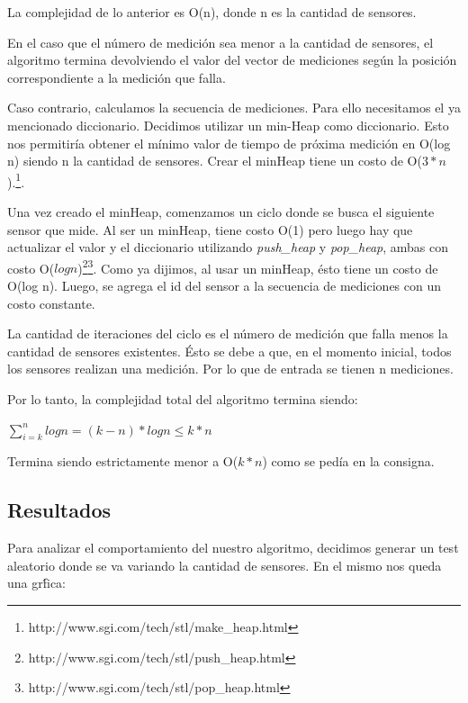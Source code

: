 \quad La complejidad de lo anterior es O(n), donde n es la cantidad de sensores.

\quad En el caso que el n\'umero de medici\'on sea menor a la cantidad de sensores, el algoritmo termina devolviendo el valor del vector de mediciones seg\'un la posici\'on correspondiente a la medici\'on que falla.

\quad Caso contrario, calculamos la secuencia de mediciones. Para ello necesitamos el ya mencionado diccionario. Decidimos utilizar un min-Heap como diccionario. Esto nos permitir\'ia obtener el m\'inimo valor de tiempo de pr\'oxima medici\'on en O(log n) siendo n la cantidad de sensores. Crear el minHeap tiene un costo de O($ 3*n $).\footnote{http://www.sgi.com/tech/stl/make\_heap.html}.

\quad Una vez creado el minHeap, comenzamos un ciclo donde se busca el siguiente sensor que mide. Al ser un minHeap, tiene costo O(1) pero luego hay que actualizar el valor y el diccionario utilizando \textit{push\_heap} y \textit{pop\_heap}, ambas con costo O($log n$)\footnote{http://www.sgi.com/tech/stl/push\_heap.html}\footnote{http://www.sgi.com/tech/stl/pop\_heap.html}. Como ya dijimos, al usar un minHeap, \'esto tiene un costo de O(log n). Luego, se agrega el id del sensor a la secuencia de mediciones con un costo constante.

\quad La cantidad de iteraciones del ciclo es el n\'umero de medici\'on que falla menos la cantidad de sensores existentes. \'Esto se debe a que, en el momento inicial, todos los sensores realizan una medici\'on. Por lo que de entrada se tienen n mediciones.

\quad Por lo tanto, la complejidad total del algoritmo termina siendo:


\quad


$ \displaystyle\sum_{i = k}^{n} log n = (k - n) * log n \leq k * n$


\quad


\quad Termina siendo estrictamente menor a O($ k*n $) como se ped\'ia en la consigna.


\quad


\subsection{Resultados}

\quad Para analizar el comportamiento del nuestro algoritmo, decidimos generar un test aleatorio donde se va variando la cantidad de sensores. En el mismo nos queda una gr\'fica:


